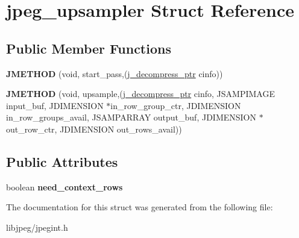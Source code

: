 \hypertarget{structjpeg__upsampler}{\section{jpeg\-\_\-upsampler Struct Reference}
\label{structjpeg__upsampler}
}
\subsection*{Public Member Functions}
\begin{DoxyCompactItemize}
\item 
\hypertarget{structjpeg__upsampler_a01ac725bfe78e05e7671547504a95346}{{\bfseries J\-M\-E\-T\-H\-O\-D} (void, start\-\_\-pass,(\hyperlink{structjpeg__decompress__struct}{j\-\_\-decompress\-\_\-ptr} cinfo))}\label{structjpeg__upsampler_a01ac725bfe78e05e7671547504a95346}

\item 
\hypertarget{structjpeg__upsampler_a23e9af5ee7259d39179063e3ece9fb8f}{{\bfseries J\-M\-E\-T\-H\-O\-D} (void, upsample,(\hyperlink{structjpeg__decompress__struct}{j\-\_\-decompress\-\_\-ptr} cinfo, J\-S\-A\-M\-P\-I\-M\-A\-G\-E input\-\_\-buf, J\-D\-I\-M\-E\-N\-S\-I\-O\-N $\ast$in\-\_\-row\-\_\-group\-\_\-ctr, J\-D\-I\-M\-E\-N\-S\-I\-O\-N in\-\_\-row\-\_\-groups\-\_\-avail, J\-S\-A\-M\-P\-A\-R\-R\-A\-Y output\-\_\-buf, J\-D\-I\-M\-E\-N\-S\-I\-O\-N $\ast$out\-\_\-row\-\_\-ctr, J\-D\-I\-M\-E\-N\-S\-I\-O\-N out\-\_\-rows\-\_\-avail))}\label{structjpeg__upsampler_a23e9af5ee7259d39179063e3ece9fb8f}

\end{DoxyCompactItemize}
\subsection*{Public Attributes}
\begin{DoxyCompactItemize}
\item 
\hypertarget{structjpeg__upsampler_af1ed2e1ca01280221b9c1305fc557e45}{boolean {\bfseries need\-\_\-context\-\_\-rows}}\label{structjpeg__upsampler_af1ed2e1ca01280221b9c1305fc557e45}

\end{DoxyCompactItemize}


The documentation for this struct was generated from the following file\-:\begin{DoxyCompactItemize}
\item 
libjpeg/jpegint.\-h\end{DoxyCompactItemize}

